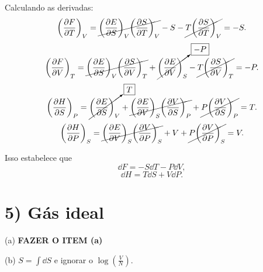 \documentclass[a4paper,10pt]{article}
\begin{document}
Calculando as derivadas:
$$
\qty(\pdv{F}{T})_{V} = \cancel{\qty(\pdv{E}{S})_V \qty(\pdv{S}{T})_V} - S - \cancel{T \qty(\pdv{S}{T})_V} = - S.
$$
$$
\qty(\pdv{F}{V})_{T} = \cancel{\qty(\pdv{E}{S})_V \qty(\pdv{S}{V})_T} + \cancelto{\boxed{-P}}{\qty(\pdv{E}{V})_S} - \cancel{T \qty(\pdv{S}{V})_T} = -P.
$$
$$
\qty(\pdv{H}{S})_{P} = \cancelto{\boxed{T}}{\qty(\pdv{E}{S})_V} + \cancel{\qty(\pdv{E}{V})_S \qty(\pdv{V}{S})_P} + \cancel{P \qty(\pdv{V}{S})_P} = T.
$$
$$
\qty(\pdv{H}{P})_{S} = \cancel{\qty(\pdv{E}{V})_S \qty(\pdv{V}{P})_S} + V + \cancel{P \qty(\pdv{V}{P})_S} = V.
$$

Isso estabelece que
$$
\boxed{ \dd{F} = -S \dd{T} - P \dd{V}, }
$$
$$
\boxed{ \dd{H} = T \dd{S} + V \dd{P}. }
$$


\pagebreak

\section*{5) Gás ideal}

(a) \textbf{FAZER O ITEM (a)}

\n\n

(b) $S = \int \dd{S}$ e ignorar o $\log(\frac{V}{N})$.
\end{document}
